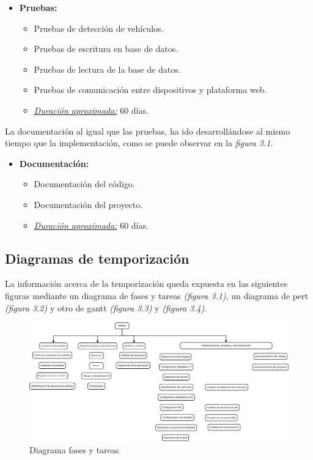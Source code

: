 \begin{itemize}
 \item \textbf{Pruebas:}
 \begin{itemize}
  \item Pruebas de detección de vehículos.
  \item Pruebas de escritura en base de datos.
  \item Pruebas de lectura de la base de datos.
  \item Pruebas de comunicación entre dispositivos y plataforma web.
  \item \underline{\textit{Duración aproximada:}} 60 días.
 \end{itemize}
\end{itemize}

La documentación al igual que las pruebas, ha ido desarrollándose al mismo tiempo que la implementación, como se puede observar en la \textit{figura 3.1}.

\begin{itemize}
 \item \textbf{Documentación:}
 \begin{itemize}
  \item Documentación del código.
  \item Documentación del proyecto.
  \item \underline{\textit{Duración aproximada:}} 60 días.
 \end{itemize}
\end{itemize}

\subsection{Diagramas de temporización}

La información acerca de la temporización queda expuesta en las siguientes figuras mediante un diagrama de fases y tareas \textit{(figura 3.1)}, un diagrama de pert \textit{(figura 3.2)} y otro de gantt \textit{(figura 3.3)} y \textit{(figura 3.4)}.

\begin{figure}[!ht]
  \begin{center}
    \includegraphics[scale=0.30]{../images/diag_plan/fases_tareas.png}
    \caption{Diagrama fases y tareas}
    \label{fig:fases_tareas}
  \end{center}
\end{figure}

